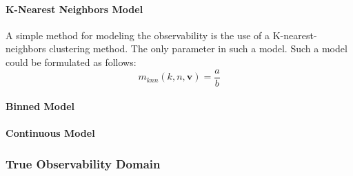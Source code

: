 \paragraph{K-Nearest Neighbors Model}
A simple method for modeling the observability is the use of a K-nearest-neighbors clustering method. The only parameter in such a model. Such a model could be formulated as follows:
$$
    m_{knn}(k, n, \boldsymbol{v}) = \frac{a}{b}
$$
\paragraph{Binned Model}
\paragraph{Continuous Model}

\subsubsection{True Observability Domain}